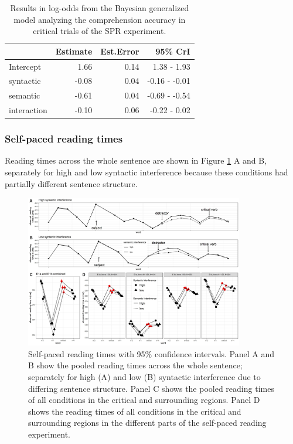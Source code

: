 \documentclass[a4paper, man, floatsintext]{apa7}
\begin{document}
\begin{table}[H]
    \caption{Results in log-odds from the Bayesian generalized model analyzing the comprehension accuracy in critical trials of the SPR experiment.}
    \label{tab:spr_acc_mod}
    \centering
    \begin{tabular}{lrrr}
    \toprule
    & Estimate & Est.Error & 95\% CrI  \\
    \midrule
Intercept& 1.66 & 0.14&  1.38 - 1.93\\
syntactic& -0.08 & 0.04& -0.16 - -0.01\\
semantic&  -0.61 &0.04& -0.69 - -0.54\\
interaction& -0.10& 0.06& -0.22 - 0.02\\
    \bottomrule
    \end{tabular}
\end{table}


\subsubsection{Self-paced reading times}
Reading times across the whole sentence are shown in Figure \ref{fig:whole_sentence} A and B, separately for high and low syntactic interference because these conditions had partially different sentence structure. 

\begin{figure}
    \caption{Self-paced reading times with 95\% confidence intervals. Panel A and B show the pooled reading times across the whole sentence; separately for high (A) and low (B) syntactic interference due to differing sentence structure. Panel C shows the pooled reading times of all conditions in the critical and surrounding regions. Panel D shows the reading times of all conditions in the critical and surrounding regions in the different parts of the self-paced reading experiment.}
    \label{fig:whole_sentence}
    \centering
    \includegraphics[width=0.85\textwidth]{images/Pandora_all_wholesentence_pooled_zoom_exp.jpg}
\end{figure}
\clearpage
\end{document}
